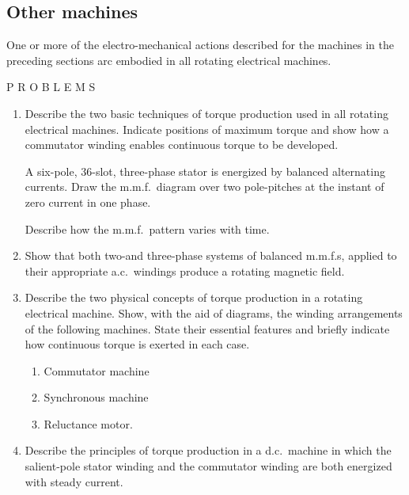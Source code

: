 \documentclass[a4paper,numbers=noenddot,12pt]{scrbook}
\begin{document}
            \subsection{Other machines}
            One or more of the electro-mechanical actions described for the machines in the preceding sections arc embodied in all rotating electrical machines.

            \begingroup
            \fontsize{10pt}{12pt}\selectfont
            \begin{center}
                P R O B L E M S
            \end{center}

            \begin{enumerate}[label={\thechapter.\arabic*},leftmargin=*]
                \item Describe the two basic techniques of torque production used in all rotating electrical machines. Indicate positions of maximum torque and show how a commutator winding enables continuous torque to be developed.

                    A six-pole, 36-slot, three-phase stator is energized by balanced alternating currents. Draw the m.m.f.\ diagram over two pole-pitches at the instant of zero current in one phase.

                    Describe how the m.m.f.\ pattern varies with time.
                \item Show that both two-and three-phase systems of balanced m.m.f.s, applied to their appropriate a.c.\ windings produce a rotating magnetic field. 
                \item Describe the two physical concepts of torque production in a rotating electrical machine. Show, with the aid of diagrams, the winding arrangements of the following machines. State their essential features and briefly indicate how continuous torque is exerted in each case. 
                    \begin{enumerate}
                        \item Commutator machine 
                        \item Synchronous machine
                        \item Reluctance motor.
                    \end{enumerate}
                \item Describe the principles of torque production in a d.c.\ machine in which the salient-pole stator winding and the commutator winding are both energized with steady current. 


\end{enumerate}
\end{document}

